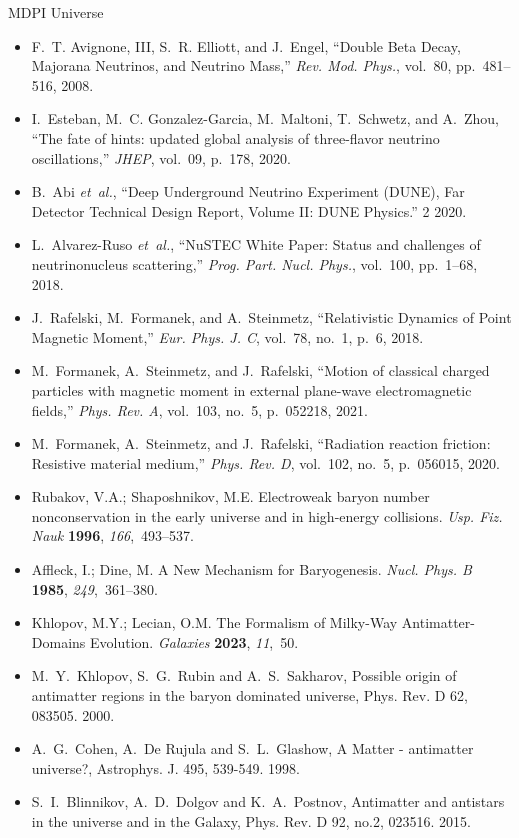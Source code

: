 \documentclass[a4paper, 10pt]{letter}
\begin{document}
\begin{letter}{MDPI Universe}
\begin{itemize}
    \item F.~T. Avignone, III, S.~R. Elliott, and J.~Engel, ``{Double Beta Decay, Majorana Neutrinos, and Neutrino Mass},'' {\em Rev. Mod. Phys.}, vol.~80, pp.~481--516, 2008.
    \item I.~Esteban, M.~C. Gonzalez-Garcia, M.~Maltoni, T.~Schwetz, and A.~Zhou, ``{The fate of hints: updated global analysis of three-flavor neutrino oscillations},'' {\em JHEP}, vol.~09, p.~178, 2020.
    \item B.~Abi {\em et~al.}, ``{Deep Underground Neutrino Experiment (DUNE), Far Detector Technical Design Report, Volume II: DUNE Physics}.'' 2 2020.
    \item L.~Alvarez-Ruso {\em et~al.}, ``{NuSTEC White Paper: Status and challenges of neutrino\textendash{}nucleus scattering},'' {\em Prog. Part. Nucl. Phys.}, vol.~100, pp.~1--68, 2018.
    \item J.~Rafelski, M.~Formanek, and A.~Steinmetz, ``{Relativistic Dynamics of Point Magnetic Moment},'' {\em Eur. Phys. J. C}, vol.~78, no.~1, p.~6, 2018.
    \item M.~Formanek, A.~Steinmetz, and J.~Rafelski, ``{Motion of classical charged particles with magnetic moment in external plane-wave electromagnetic fields},'' {\em Phys. Rev. A}, vol.~103, no.~5, p.~052218, 2021.
    \item M.~Formanek, A.~Steinmetz, and J.~Rafelski, ``{Radiation reaction friction: Resistive material medium},'' {\em Phys. Rev. D}, vol.~102, no.~5, p.~056015, 2020.
    \item Rubakov, V.A.; Shaposhnikov, M.E. {Electroweak baryon number nonconservation in the early universe and  in high-energy collisions}. {\em Usp. Fiz. Nauk} {\bf 1996}, {\em 166},~493--537.
    \item Affleck, I.; Dine, M. {A New Mechanism for Baryogenesis}. {\em Nucl. Phys. B} {\bf 1985}, {\em 249},~361--380.
    \item Khlopov, M.Y.; Lecian, O.M. {The Formalism of Milky-Way Antimatter-Domains Evolution}. {\em Galaxies} {\bf 2023}, {\em 11},~50.
    \item M.~Y.~Khlopov, S.~G.~Rubin and A.~S.~Sakharov, {Possible origin of antimatter regions in the baryon dominated universe}, Phys. Rev. D 62, 083505. 2000.
    \item A.~G.~Cohen, A.~De Rujula and S.~L.~Glashow, {A Matter - antimatter universe?}, Astrophys. J. 495, 539-549. 1998.
    \item S.~I.~Blinnikov, A.~D.~Dolgov and K.~A.~Postnov, {Antimatter and antistars in the universe and in the Galaxy}, Phys. Rev. D 92, no.2, 023516. 2015.

\end{itemize}
\end{letter}
\end{document}
